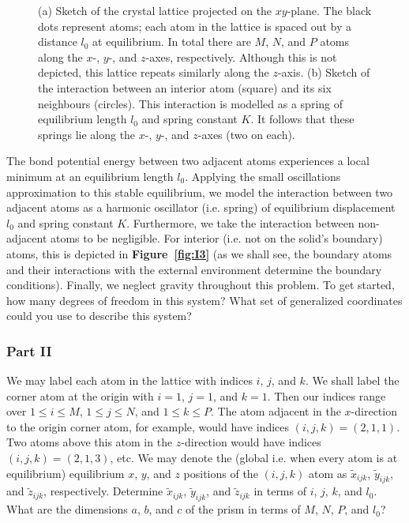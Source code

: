 \documentclass[letterpaper,12pt]{article}
\begin{document}
\begin{flushleft}
\begin{figure}[h]
\begin{subfigure}[b]{0.3\textwidth}
        \end{subfigure}
        \caption{(a) Sketch of the crystal lattice projected on the $xy$-plane. The black dots represent atoms; each atom in the lattice is spaced out by a distance $l_0$ at equilibrium. In total there are $M$, $N$, and $P$ atoms along the $x$-, $y$-, and $z$-axes, respectively. Although this is not depicted, this lattice repeats similarly along the $z$-axis. (b) Sketch of the interaction between an interior atom (square) and its six neighbours (circles). This interaction is modelled as a spring of equilibrium length $l_0$ and spring constant $K$. It follows that these springs lie along the $x$-, $y$-, and $z$-axes (two on each).}
    \end{figure}
    The bond potential energy between two adjacent atoms experiences a local minimum at an equilibrium length $l_0$. Applying the small oscillations approximation to this stable equilibrium, we model the interaction between two adjacent atoms as a harmonic oscillator (i.e. spring) of equilibrium displacement $l_0$ and spring constant $K$. Furthermore, we take the interaction between non-adjacent atoms to be negligible. For interior (i.e. not on the solid's boundary) atoms, this is depicted in \textbf{Figure~\ref{fig:I3}} (as we shall see, the boundary atoms and their interactions with the external environment determine the boundary conditions). Finally, we neglect gravity throughout this problem.\newline\newline
    To get started, how many degrees of freedom in this system? What set of generalized coordinates could you use to describe this system?

    \subsubsection*{Part II}
    We may label each atom in the lattice with indices $i$, $j$, and $k$. We shall label the corner atom at the origin with $i = 1$, $j = 1$, and $k = 1$. Then our indices range over $1 \leq i \leq M$, $1 \leq j \leq N$, and $1 \leq k \leq P$. The atom adjacent in the $x$-direction to the origin corner atom, for example, would have indices $(i, j, k) = (2, 1, 1)$. Two atoms above this atom in the $z$-direction would have indices $(i, j, k) = (2, 1, 3)$, etc. We may denote the (global i.e. when every atom is at equilibrium) equilibrium $x$, $y$, and $z$ positions of the $(i, j, k)$ atom as $\tilde{x}_{ijk}$, $\tilde{y}_{ijk}$, and $\tilde{z}_{ijk}$, respectively. \newline\newline
    Determine $\tilde{x}_{ijk}$, $\tilde{y}_{ijk}$, and $\tilde{z}_{ijk}$ in terms of $i$, $j$, $k$, and $l_0$. What are the dimensions $a$, $b$, and $c$ of the prism in terms of $M$, $N$, $P$, and $l_0$?


\end{flushleft}
\end{document}
